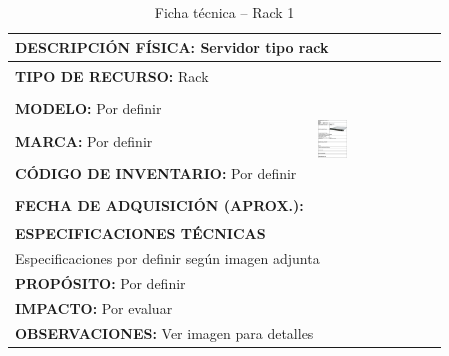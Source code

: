 \begin{table}[H]
\centering
\caption{Ficha técnica -- Rack 1}
\label{tab:rack-1}
\begin{tabular}{|p{}|p{}|}
\hline
\multicolumn{2}{|l|}{\textbf{DESCRIPCIÓN FÍSICA:} Servidor tipo rack} \\ \hline
\textbf{TIPO DE RECURSO:} Rack & 
\multirow{5}{*}{\includegraphics[width=0.25\textwidth,height=4cm,keepaspectratio]{tablas-images/cp1/racks/rack-1.png}} \\ \cline{1-1}
\textbf{MODELO:} Por definir & \\ \cline{1-1}
\textbf{MARCA:} Por definir & \\ \cline{1-1}
\textbf{CÓDIGO DE INVENTARIO:} Por definir & \\ \cline{1-1}
\textbf{FECHA DE ADQUISICIÓN (APROX.):} & \\ \hline
\multicolumn{2}{|l|}{\textbf{ESPECIFICACIONES TÉCNICAS}} \\ \hline
\multicolumn{2}{|p{0.95\textwidth}|}{
\footnotesize
Especificaciones por definir según imagen adjunta
} \\ \hline
\multicolumn{2}{|l|}{\textbf{PROPÓSITO:} Por definir} \\ \hline
\multicolumn{2}{|l|}{\textbf{IMPACTO:} Por evaluar} \\ \hline
\multicolumn{2}{|l|}{\textbf{OBSERVACIONES:} Ver imagen para detalles} \\ \hline
\end{tabular}
\end{table}

